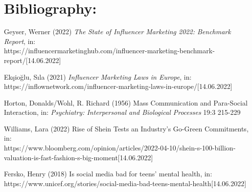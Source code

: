 \documentclass{article}
\begin{document}
	\section*{Bibliography:}
	\begin{list}{}{\setlength{\leftmargin}{1cm}\setlength{\itemindent}{-1cm}}
	\item{Geyser, Werner (2022) \textit{\glqq The State of Influencer Marketing 2022: Benchmark Report\grqq}, in: \\https://influencermarketinghub.com/influencer-marketing-benchmark-report/[14.06.2022]}
	\item{Ekşioğlu, Sıla (2021) \textit{\glqq Influencer Marketing Laws in Europe\grqq}, in: https://inflownetwork.com/influencer-marketing-laws-in-europe/[14.06.2022]}
	\item{Horton, Donalds/Wohl, R. Richard (1956) \glqq Mass Communication and Para-Social Interaction\grqq, in: \textit{Psychiatry: Interpersonal and Biological Processes} 19:3 215-229}
	\item{Williams, Lara (2022) \glqq Rise of Shein Tests an Industry’s Go-Green Commitments\grqq, in: \\ https://www.bloomberg.com/opinion/articles/2022-04-10/shein-s-100-billion-valuation-is-fast-fashion-s-big-moment[14.06.2022]}
	\item{Fersko, Henry (2018) \glqq Is social media bad for teens' mental health\grqq, in: https://www.unicef.org/stories/social-media-bad-teens-mental-health[14.06.2022]}
	\end{list}

	
\end{document}
